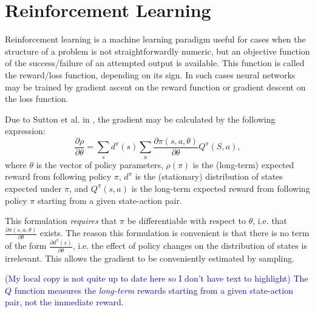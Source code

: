 \documentclass[12pt,twoside]{reedthesis}
\newcommand{\comment}[2]{\textbf{#1} \textcolor{blue}{#2}}
\begin{document}

    \section{Reinforcement Learning}
        Reinforcement learning is a machine learning paradigm useful for cases when the structure of a problem is not straightforwardly numeric, but an objective function of the success/failure of an attempted output is available. This function is called the reward/loss function, depending on its sign. In such cases neural networks may be trained by gradient ascent on the reward function or gradient descent on the loss function.
        
        Due to Sutton et al. in \cite{sutton1999policygradient}, the gradient may be calculated by the following expression:
        \[
            \frac{\partial \rho}{\partial \theta} = \sum_s d^\pi(s) \sum_a \frac{\partial \pi(s,a, \theta)}{\partial \theta}Q^\pi(S,a),
        \]
        where $\theta$ is the vector of policy parameters, $\rho(\pi)$ is the (long-term) expected reward from following policy $\pi$, $d^\pi$ is the (stationary) distribution of states expected under $\pi$, and $Q^\pi(s,a)$ is the long-term expected reward from following policy $\pi$ starting from a given state-action pair.
        
        This formulation \textit{requires} that $\pi$ be differentiable with respect to $\theta$, i.e. that $\frac{\partial \pi(s,a, \theta)}{\partial \theta}$ exists.
        The reason this formulation is convenient is that there is no term of the form $\frac{\partial d^\pi(s)}{\partial \theta}$, i.e. the effect of policy changes on the distribution of states is irrelevant.
        This allows the gradient to be conveniently estimated by sampling.  %

        \comment{}{(My local copy is not quite up to date here so I don't have text to highlight) The $Q$ function measures the \emph{long-term} rewards starting from a given state-action pair, not the immediate reward.}
\end{document}
